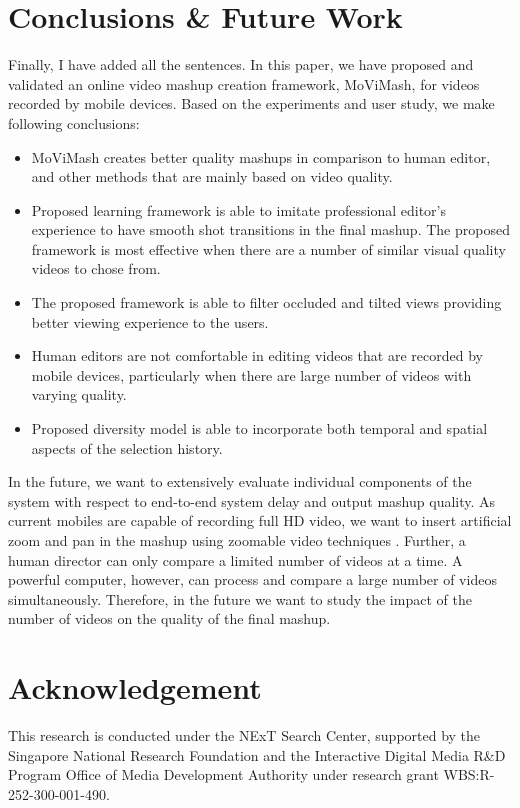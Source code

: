 \documentclass{sig-alternate}
\begin{document}
\section{ Conclusions \& Future Work}\label{future}
Finally, I have added all the sentences.
In this paper, we have proposed and validated an online video
mashup creation framework, MoViMash, for videos recorded by mobile devices. Based on the experiments and user study, we make following conclusions:
\begin{itemize}
    \item MoViMash creates better quality mashups in comparison to human editor, and other methods that are mainly based on video quality.
    \item Proposed learning framework is able to imitate professional editor\textquoteright s experience to have smooth shot transitions in the final mashup. The proposed framework is most effective when there are a number of similar visual quality videos to chose from.
    \item The proposed framework is able to filter occluded and tilted views providing better viewing experience to the users.
    \item Human editors are not comfortable in editing videos that are recorded by mobile devices, particularly when there are large number of videos with varying quality.
    \item Proposed diversity model is able to incorporate both temporal and spatial aspects of the selection history.
\end{itemize}
In the future, we want to extensively evaluate individual components of the system with respect to end-to-end system delay and output mashup quality. As current mobiles are capable of recording full HD video, we want to insert artificial zoom and pan in the mashup using zoomable video techniques \cite{11}. Further, a human director can only compare a limited number of videos at a time. A powerful computer, however, can process and compare a large number of videos simultaneously. Therefore, in the future we want to study the impact of the number of videos on the quality of the final mashup.

\section*{Acknowledgement}
This research is conducted under the NExT Search Center, supported
by the Singapore National Research Foundation and the Interactive
Digital Media R\&D Program Office of Media Development Authority under research grant WBS:R-252-300-001-490.
\end{document}
